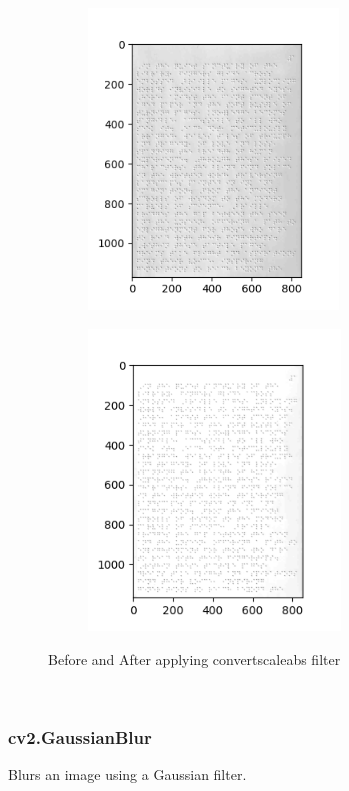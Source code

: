 \begin{figure}[h!]
     \centering
     \begin{subfigure}
         \centering
         \includegraphics[width=.48\textwidth,height=8cm]{image9.png}
     \end{subfigure}
     \hfill
     \begin{subfigure}
         \centering
         \includegraphics[width=.48\textwidth,height=8cm]{image11.png}
     \end{subfigure}
        \caption{Before and After applying convertscaleabs filter}
        \label{fig:Clear real braille samples}
\end{figure}\\

\newpage
\hypertarget{cv2.gaussianblur}{%
\subsubsection{cv2.GaussianBlur}\label{cv2.gaussianblur}}

Blurs an image using a Gaussian filter.\\

